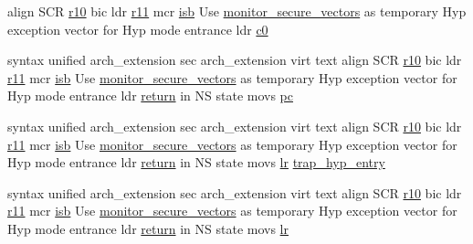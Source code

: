 \begin{DoxyCompactItemize}
align \-S\-C\-R \hyperlink{monitor__secure_8_s_ac3bf51173e39a81ec089049af2b9b854}{r10} bic ldr \hyperlink{monitor__secure_8_s_a8788e5e3f963472b5ed8405a3340c314}{r11} mcr \*
\hyperlink{asm-arm__inline_8h_a14f7cb726dd83983648772947d1e60d8}{isb} \-Use \hyperlink{monitor__secure_8_s_a4d354f7295ddc2f288384d4e03458837}{monitor\-\_\-secure\-\_\-vectors} \*
as temporary \-Hyp exception \*
vector for \-Hyp mode entrance \*
ldr \hyperlink{monitor__secure_8_s_ab27b8b5969509d6e2728aa7e458a4d9b}{c0}
\item 
syntax unified arch\-\_\-extension \*
sec arch\-\_\-extension virt text \*
align \-S\-C\-R \hyperlink{monitor__secure_8_s_ac3bf51173e39a81ec089049af2b9b854}{r10} bic ldr \hyperlink{monitor__secure_8_s_a8788e5e3f963472b5ed8405a3340c314}{r11} mcr \*
\hyperlink{asm-arm__inline_8h_a14f7cb726dd83983648772947d1e60d8}{isb} \-Use \hyperlink{monitor__secure_8_s_a4d354f7295ddc2f288384d4e03458837}{monitor\-\_\-secure\-\_\-vectors} \*
as temporary \-Hyp exception \*
vector for \-Hyp mode entrance \*
ldr \hyperlink{monitor_8_s_afb820df2c9dbd34b23c1372ce18de4a8}{return} in \-N\-S state movs \hyperlink{monitor__secure_8_s_a27468faba76ab3fb5458fb06c0f2af8a}{pc}
\item 
syntax unified arch\-\_\-extension \*
sec arch\-\_\-extension virt text \*
align \-S\-C\-R \hyperlink{monitor__secure_8_s_ac3bf51173e39a81ec089049af2b9b854}{r10} bic ldr \hyperlink{monitor__secure_8_s_a8788e5e3f963472b5ed8405a3340c314}{r11} mcr \*
\hyperlink{asm-arm__inline_8h_a14f7cb726dd83983648772947d1e60d8}{isb} \-Use \hyperlink{monitor__secure_8_s_a4d354f7295ddc2f288384d4e03458837}{monitor\-\_\-secure\-\_\-vectors} \*
as temporary \-Hyp exception \*
vector for \-Hyp mode entrance \*
ldr \hyperlink{monitor_8_s_afb820df2c9dbd34b23c1372ce18de4a8}{return} in \-N\-S state movs \hyperlink{context_8h_a6ced3f4007bb60daf12191c058e55b8c}{lr} \hyperlink{monitor__secure_8_s_a6d2d563d2b5c45de176f478b60b4111e}{trap\-\_\-hyp\-\_\-entry}
\item 
syntax unified arch\-\_\-extension \*
sec arch\-\_\-extension virt text \*
align \-S\-C\-R \hyperlink{monitor__secure_8_s_ac3bf51173e39a81ec089049af2b9b854}{r10} bic ldr \hyperlink{monitor__secure_8_s_a8788e5e3f963472b5ed8405a3340c314}{r11} mcr \*
\hyperlink{asm-arm__inline_8h_a14f7cb726dd83983648772947d1e60d8}{isb} \-Use \hyperlink{monitor__secure_8_s_a4d354f7295ddc2f288384d4e03458837}{monitor\-\_\-secure\-\_\-vectors} \*
as temporary \-Hyp exception \*
vector for \-Hyp mode entrance \*
ldr \hyperlink{monitor_8_s_afb820df2c9dbd34b23c1372ce18de4a8}{return} in \-N\-S state movs \hyperlink{context_8h_a6ced3f4007bb60daf12191c058e55b8c}{lr} \*

\end{DoxyCompactItemize}

